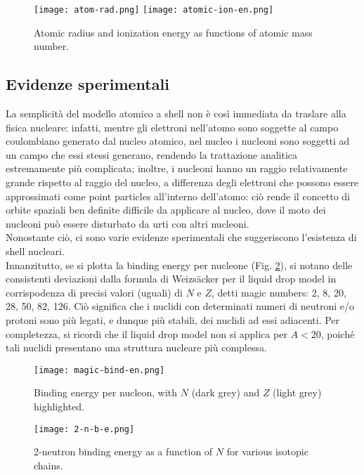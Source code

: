\begin{figure}[!t]
	\centering
	\texttt{[image: atom-rad.png]}
	\texttt{[image: atomic-ion-en.png]}
	\caption{Atomic radius and ionization energy as functions of atomic mass number.}
	\label{atom-prop}
\end{figure}

\subsection{Evidenze sperimentali}

La semplicità del modello atomico a shell non è così immediata da traslare alla fisica nucleare: infatti, mentre gli elettroni nell'atomo sono soggette al campo coulombiano generato dal nucleo atomico, nel nucleo i nucleoni sono soggetti ad un campo che essi stessi generano, rendendo la trattazione analitica estremamente più complicata; inoltre, i nucleoni hanno un raggio relativamente grande rispetto al raggio del nucleo, a differenza degli elettroni che possono essere approssimati come point particles all'interno dell'atomo: ciò rende il concetto di orbite spaziali ben definite difficile da applicare al nucleo, dove il moto dei nucleoni può essere disturbato da urti con altri nucleoni.\\
Nonostante ciò, ci sono varie evidenze sperimentali che suggeriscono l'esistenza di shell nucleari.\\
Innanzitutto, se si plotta la binding energy per nucleone (Fig. \ref{magic-bind-en}), si notano delle consistenti deviazioni dalla formula di Weizsäcker per il liquid drop model in corrispodenza di precisi valori (uguali) di $ N $ e $ Z $, detti magic numbers: 2, 8, 20, 28, 50, 82, 126. Ciò significa che i nuclidi con determinati numeri di neutroni e/o protoni sono più legati, e dunque più stabili, dei nuclidi ad essi adiacenti. Per completezza, si ricordi che il liquid drop model non si applica per $ A < 20 $, poiché tali nuclidi presentano una struttura nucleare più complessa.

\begin{figure}[!t]
	\centering
	\texttt{[image: magic-bind-en.png]}
	\caption{Binding energy per nucleon, with $ N $ (dark grey) and $ Z $ (light grey) highlighted.}
	\label{magic-bind-en}
\end{figure}

\begin{figure}[!ht]
	\centering
	\texttt{[image: 2-n-b-e.png]}
	\caption{2-neutron binding energy as a function of $ N $ for various isotopic chains.}
	\label{2-n-b-e}
\end{figure}

